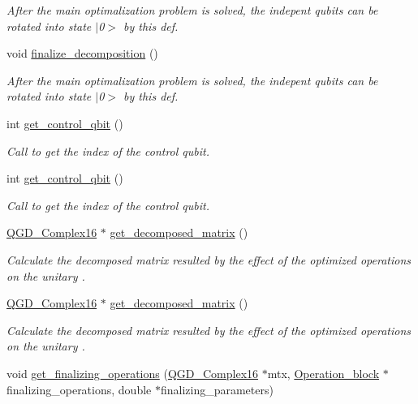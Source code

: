 \begin{DoxyCompactItemize}
\begin{DoxyCompactList}\small\item\em After the main optimalization problem is solved, the indepent qubits can be rotated into state $\vert$0$>$ by this def. \end{DoxyCompactList}\item 
void \hyperlink{class_decomposition___base_a0cdd12741e72e2c074a188fe3867e6d5}{finalize\+\_\+decomposition} ()
\begin{DoxyCompactList}\small\item\em After the main optimalization problem is solved, the indepent qubits can be rotated into state $\vert$0$>$ by this def. \end{DoxyCompactList}\item 
int \hyperlink{class_operation_a2e9b60d334a0e0c99dede014ac989d0a}{get\+\_\+control\+\_\+qbit} ()
\begin{DoxyCompactList}\small\item\em Call to get the index of the control qubit. \end{DoxyCompactList}\item 
int \hyperlink{class_operation_a2e9b60d334a0e0c99dede014ac989d0a}{get\+\_\+control\+\_\+qbit} ()
\begin{DoxyCompactList}\small\item\em Call to get the index of the control qubit. \end{DoxyCompactList}\item 
\hyperlink{struct_q_g_d___complex16}{Q\+G\+D\+\_\+\+Complex16} $\ast$ \hyperlink{class_decomposition___base_a40154345dce69fd5a9cb28c0b677746b}{get\+\_\+decomposed\+\_\+matrix} ()
\begin{DoxyCompactList}\small\item\em Calculate the decomposed matrix resulted by the effect of the optimized operations on the unitary . \end{DoxyCompactList}\item 
\hyperlink{struct_q_g_d___complex16}{Q\+G\+D\+\_\+\+Complex16} $\ast$ \hyperlink{class_decomposition___base_ae71eaec68c77e79716cae632f97d42eb}{get\+\_\+decomposed\+\_\+matrix} ()
\begin{DoxyCompactList}\small\item\em Calculate the decomposed matrix resulted by the effect of the optimized operations on the unitary . \end{DoxyCompactList}\item 
void \hyperlink{class_decomposition___base_a9832cc5308c00b73d3e6bc331a77c7f7}{get\+\_\+finalizing\+\_\+operations} (\hyperlink{struct_q_g_d___complex16}{Q\+G\+D\+\_\+\+Complex16} $\ast$mtx, \hyperlink{class_operation__block}{Operation\+\_\+block} $\ast$finalizing\+\_\+operations, double $\ast$finalizing\+\_\+parameters)

\end{DoxyCompactItemize}
